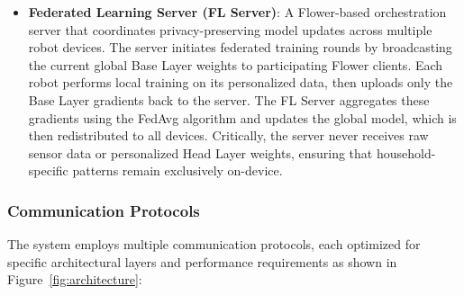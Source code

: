 \documentclass[conference]{IEEEtran}
\begin{document}
\begin{itemize}
    \item \textbf{Federated Learning Server (FL Server)}: A Flower-based orchestration server that coordinates privacy-preserving model updates across multiple robot devices. The server initiates federated training rounds by broadcasting the current global Base Layer weights to participating Flower clients. Each robot performs local training on its personalized data, then uploads only the Base Layer gradients back to the server. The FL Server aggregates these gradients using the FedAvg algorithm and updates the global model, which is then redistributed to all devices. Critically, the server never receives raw sensor data or personalized Head Layer weights, ensuring that household-specific patterns remain exclusively on-device.
\end{itemize}

\subsubsection{Communication Protocols}

The system employs multiple communication protocols, each optimized for specific architectural layers and performance requirements as shown in Figure~\ref{fig:architecture}:
\end{document}
